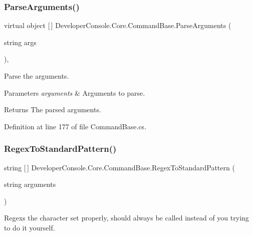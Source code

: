 \subsubsection{\texorpdfstring{Parse\+Arguments()}{ParseArguments()}}
{\footnotesize\ttfamily virtual object \mbox{[}$\,$\mbox{]} Developer\+Console.\+Core.\+Command\+Base.\+Parse\+Arguments (\begin{DoxyParamCaption}\item[{string}]{args }\end{DoxyParamCaption})\hspace{0.3cm}{\ttfamily [protected]}, {\ttfamily [virtual]}}



Parse the arguments. 


\begin{DoxyParams}{Parameters}
{\em arguments} & Arguments to parse.\\
\hline
\end{DoxyParams}
\begin{DoxyReturn}{Returns}
The parsed arguments.
\end{DoxyReturn}


Definition at line 177 of file Command\+Base.\+cs.

\mbox{\label{class_developer_console_1_1_core_1_1_command_base_a9a15420bd47468900b586ae11de88a66}} 
\subsubsection{\texorpdfstring{Regex\+To\+Standard\+Pattern()}{RegexToStandardPattern()}}
{\footnotesize\ttfamily string \mbox{[}$\,$\mbox{]} Developer\+Console.\+Core.\+Command\+Base.\+Regex\+To\+Standard\+Pattern (\begin{DoxyParamCaption}\item[{string}]{arguments }\end{DoxyParamCaption})\hspace{0.3cm}{\ttfamily [protected]}}



Regexs the character set properly, should always be called instead of you trying to do it yourself. 


